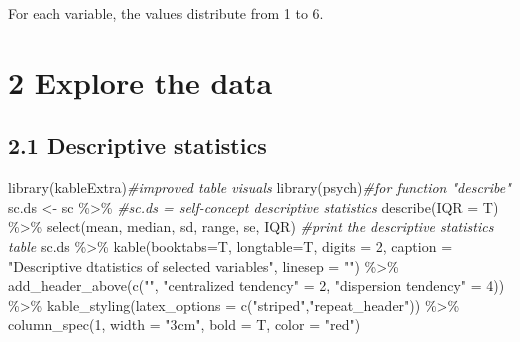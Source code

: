 \documentclass[
]{article}
\newenvironment{Shaded}{\begin{snugshade}}{\end{snugshade}}
\newcommand{\AttributeTok}[1]{\textcolor[rgb]{0.77,0.63,0.00}{#1}}
\newcommand{\CommentTok}[1]{\textcolor[rgb]{0.56,0.35,0.01}{\textit{#1}}}
\newcommand{\DecValTok}[1]{\textcolor[rgb]{0.00,0.00,0.81}{#1}}
\newcommand{\FunctionTok}[1]{\textcolor[rgb]{0.00,0.00,0.00}{#1}}
\newcommand{\NormalTok}[1]{#1}
\newcommand{\OtherTok}[1]{\textcolor[rgb]{0.56,0.35,0.01}{#1}}
\newcommand{\SpecialCharTok}[1]{\textcolor[rgb]{0.00,0.00,0.00}{#1}}
\newcommand{\StringTok}[1]{\textcolor[rgb]{0.31,0.60,0.02}{#1}}
\begin{document}
For each variable, the values distribute from 1 to 6.

\hypertarget{explore-the-data}{%
\section{2 Explore the data}\label{explore-the-data}}

\hypertarget{descriptive-statistics}{%
\subsection{2.1 Descriptive statistics}\label{descriptive-statistics}}

\begin{Shaded}
\begin{Highlighting}[]
\FunctionTok{library}\NormalTok{(kableExtra)}\CommentTok{\#improved table visuals}
\FunctionTok{library}\NormalTok{(psych)}\CommentTok{\#for function "describe"}
\NormalTok{sc.ds }\OtherTok{\textless{}{-}}\NormalTok{ sc }\SpecialCharTok{\%\textgreater{}\%}  \CommentTok{\#sc.ds = self{-}concept descriptive statistics}
  \FunctionTok{describe}\NormalTok{(}\AttributeTok{IQR =}\NormalTok{ T) }\SpecialCharTok{\%\textgreater{}\%}
  \FunctionTok{select}\NormalTok{(mean, median, sd, range, se, IQR)}
\CommentTok{\#print the descriptive statistics table}
\NormalTok{sc.ds }\SpecialCharTok{\%\textgreater{}\%} 
  \FunctionTok{kable}\NormalTok{(}\AttributeTok{booktabs=}\NormalTok{T,}
        \AttributeTok{longtable=}\NormalTok{T,}
        \AttributeTok{digits =} \DecValTok{2}\NormalTok{,}
        \AttributeTok{caption =} \StringTok{"Descriptive dtatistics of selected variables"}\NormalTok{,}
        \AttributeTok{linesep =} \StringTok{""}\NormalTok{) }\SpecialCharTok{\%\textgreater{}\%} 
  \FunctionTok{add\_header\_above}\NormalTok{(}\FunctionTok{c}\NormalTok{(}\StringTok{""}\NormalTok{, }\StringTok{"centralized tendency"} \OtherTok{=} \DecValTok{2}\NormalTok{, }\StringTok{"dispersion tendency"} \OtherTok{=} \DecValTok{4}\NormalTok{)) }\SpecialCharTok{\%\textgreater{}\%} 
  \FunctionTok{kable\_styling}\NormalTok{(}\AttributeTok{latex\_options =} \FunctionTok{c}\NormalTok{(}\StringTok{"striped"}\NormalTok{,}\StringTok{"repeat\_header"}\NormalTok{)) }\SpecialCharTok{\%\textgreater{}\%} 
  \FunctionTok{column\_spec}\NormalTok{(}\DecValTok{1}\NormalTok{, }\AttributeTok{width =} \StringTok{"3cm"}\NormalTok{, }\AttributeTok{bold =}\NormalTok{ T, }\AttributeTok{color =} \StringTok{"red"}\NormalTok{)}
\end{Highlighting}
\end{Shaded}
\end{document}

